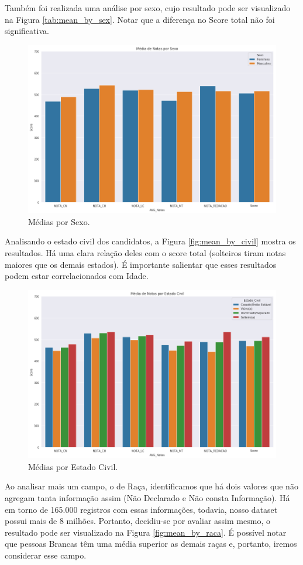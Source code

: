 \documentclass{article}
\begin{document}
Também foi realizada uma análise por sexo, cujo resultado pode ser visualizado na Figura \ref{tab:mean_by_sex}. Notar que a diferença no Score total não foi significativa.

\begin{figure}[H]
\centering
  \includegraphics[width=0.8 \linewidth]{img/mean_by_sex.png}
  \caption{Médias por Sexo.}
  \label{fig:mean_by_sex}
\end{figure}

Analisando o estado civil dos candidatos, a Figura \ref{fig:mean_by_civil} mostra os resultados. Há uma clara relação deles com o score total (solteiros tiram notas maiores que os demais estados). É importante salientar que esses resultados podem estar correlacionados com Idade.

\begin{figure}[H]
\centering
  \includegraphics[width=0.8 \linewidth]{img/mean_by_civil.png}
  \caption{Médias por Estado Civil.}
  \label{fig:mean_by_sex}
\end{figure}

Ao analisar mais um campo, o de Raça, identificamos que há dois valores que não agregam tanta informação assim (Não Declarado e Não consta Informação). Há em torno de 165.000 registros com essas informações, todavia, nosso dataset possui mais de 8 milhões. Portanto, decidiu-se por avaliar assim mesmo, o resultado pode ser visualizado na Figura \ref{fig:mean_by_raca}. É possível notar que pessoas Brancas têm uma média superior as demais raças e, portanto, iremos considerar esse campo.
\end{document}
